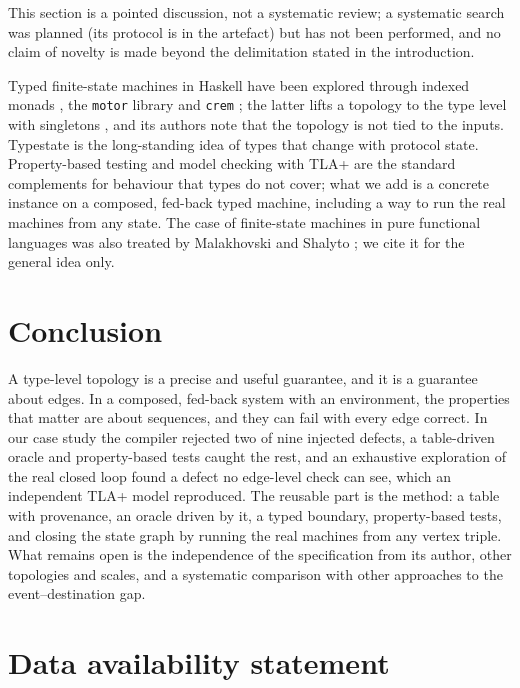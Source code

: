\documentclass[review]{jfp-epi}
\newcommand{\crem}{\texttt{crem}}
\begin{document}
This section is a pointed discussion, not a systematic review; a systematic search was planned (its protocol is in the artefact) but has not been performed, and no claim of novelty is made beyond the delimitation stated in the introduction.

Typed finite-state machines in Haskell have been explored through indexed monads \cite{atkey2009parameterised}, the \texttt{motor} library \cite{motor} and \crem{} \cite{perone2023crem}; the latter lifts a topology to the type level with singletons \cite{eisenberg2012singletons}, and its authors note that the topology is not tied to the inputs. Typestate \cite{strom1986typestate} is the long-standing idea of types that change with protocol state. Property-based testing \cite{claessen2000quickcheck,hedgehog} and model checking with TLA+ \cite{lamport2002specifying,tlaplus} are the standard complements for behaviour that types do not cover; what we add is a concrete instance on a composed, fed-back typed machine, including a way to run the real machines from any state. The case of finite-state machines in pure functional languages was also treated by Malakhovski and Shalyto \cite{malakhovski2009fsm}; we cite it for the general idea only.

\section{Conclusion}

A type-level topology is a precise and useful guarantee, and it is a guarantee about edges. In a composed, fed-back system with an environment, the properties that matter are about sequences, and they can fail with every edge correct. In our case study the compiler rejected two of nine injected defects, a table-driven oracle and property-based tests caught the rest, and an exhaustive exploration of the real closed loop found a defect no edge-level check can see, which an independent TLA+ model reproduced. The reusable part is the method: a table with provenance, an oracle driven by it, a typed boundary, property-based tests, and closing the state graph by running the real machines from any vertex triple. What remains open is the independence of the specification from its author, other topologies and scales, and a systematic comparison with other approaches to the event--destination gap.

\section*{Data availability statement}
\end{document}

